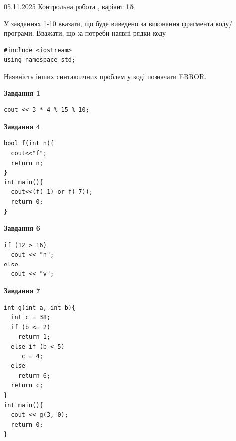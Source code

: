 \documentclass[12pt, ukrainian]{article}
\begin{document}
{\Large{05.11.2025 Контрольна робота , варіант  \No \textbf { 15 }\par}}
{
\begin {large}
У завданнях 1-10 вказати, що буде виведено за виконання фрагмента коду/про\-гра\-ми.
Вважати, що за потреби наявні рядки коду
\begin{verbatim}
#include <iostream>
using namespace std;
\end{verbatim}
Наявність інших синтаксичних проблем у коді позначати ERROR.

\begin{minipage}[t]{7.0cm}

\begin{center}
\textbf{Завдання 1}
\end{center}
\vspace{-8mm}

\begin{verbatim}
cout << 3 * 4 % 15 % 10;
\end{verbatim}



\begin{center}
\textbf{Завдання 4}
\end{center}
\vspace{-8mm}

\begin{verbatim}
bool f(int n){
  cout<<"f";
  return n;
}
int main(){
  cout<<(f(-1) or f(-7));
  return 0;
}
\end{verbatim}



\begin{center}
\textbf{Завдання 6}
\end{center}
\vspace{-8mm}

\begin{verbatim}
if (12 > 16)
  cout << "n";
else
  cout << "v";
\end{verbatim}



\begin{center}
\textbf{Завдання 7}
\end{center}
\vspace{-8mm}

\begin{verbatim}
int g(int a, int b){
  int c = 38;
  if (b <= 2)
    return 1;
  else if (b < 5)
     c = 4;
  else
    return 6;
  return c;
}
int main(){
  cout << g(3, 0);
  return 0;
}
\end{verbatim}


\end{minipage}
\end{large}}
\end{document}
